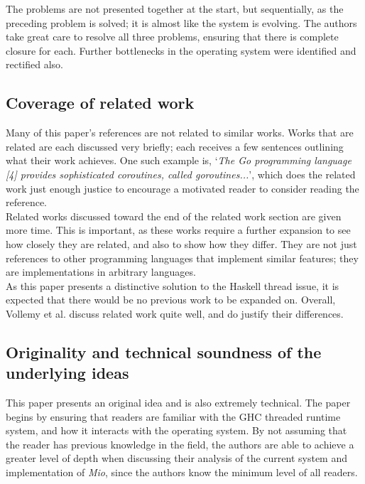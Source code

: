 \documentclass[9pt]{report}
\begin{document}
The problems are not presented together at the start, but sequentially, as the preceding problem is solved; it is almost like the system is evolving.
The authors take great care to resolve all three problems, ensuring that there is complete closure for each.
Further bottlenecks in the operating system were identified and rectified also.

\subsection*{Coverage of related work}
Many of this paper's references are not related to similar works.
Works that are related are each discussed very briefly; each receives a few sentences outlining what their work achieves.
One such example is, `{\it The Go programming language [4] provides sophisticated coroutines, called goroutines...}', which does the related work just enough justice to encourage a motivated reader to consider reading the reference.\\

\noindent
Related works discussed toward the end of the related work section are given more time.
This is important, as these works require a further expansion to see how closely they are related, and also to show how they differ.
They are not just references to other programming languages that implement similar features; they are implementations in arbitrary languages.\\

\noindent
As this paper presents a distinctive solution to the Haskell thread issue, it is expected that there would be no previous work to be expanded on.
Overall, Vollemy et al. discuss related work quite well, and do justify their differences.

\subsection*{Originality and technical soundness of the underlying ideas}
This paper presents an original idea and is also extremely technical.
The paper begins by ensuring that readers are familiar with the GHC threaded runtime system, and how it interacts with the operating system.
By not assuming that the reader has previous knowledge in the field, the authors are able to achieve a greater level of depth when discussing their analysis of the current system and implementation of {\it Mio}, since the authors know the minimum level of all readers.\\
\end{document}
